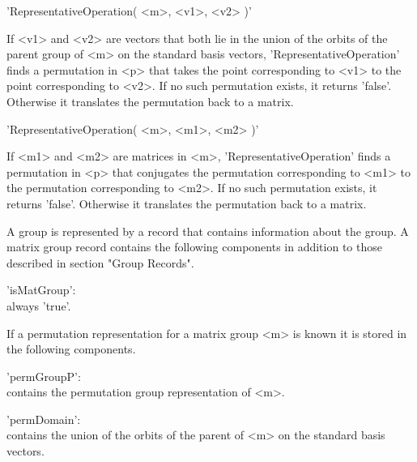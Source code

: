 \vspace{5mm}
'RepresentativeOperation( <m>, <v1>, <v2> )'

If <v1> and <v2> are vectors that both lie in the union of the  orbits of
the   parent   group   of   <m>    on   the   standard   basis   vectors,
'RepresentativeOperation' finds a permutation in <p> that takes the point
corresponding  to <v1> to  the point corresponding to  <v2>.  If no  such
permutation  exists, it returns 'false'.   Otherwise  it  translates  the
permutation back to a matrix.

\vspace{5mm}
'RepresentativeOperation( <m>, <m1>, <m2> )'

If <m1> and <m2> are  matrices in <m>,  'RepresentativeOperation' finds a
permutation in <p> that conjugates the permutation corresponding to  <m1>
to the permutation corresponding to <m2>.  If no such permutation exists,
it returns 'false'.   Otherwise it  translates the permutation back to  a
matrix.


A group is  represented by  a record that  contains information about the
group.   A matrix  group  record  contains the  following  components  in
addition to those described in section "Group Records".

'isMatGroup': \\
    always 'true'.

If a  permutation representation  for a matrix group  <m> is known it  is
stored in the following components.

'permGroupP': \\
    contains the permutation group representation of <m>.

'permDomain': \\
    contains the union of the orbits of the parent of <m> on the standard
    basis vectors.




